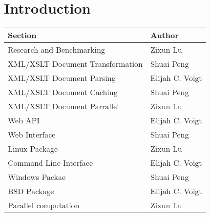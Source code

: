 \section{Introduction}

\begin{center}
    \begin{tabular}{ | l | p{10cm} |}
    \hline
    Section & Author \\ \hline
    Research and Benchmarking & Zixun Lu \\ \hline
    XML/XSLT Document Transformation & Shuai Peng \\ \hline
    XML/XSLT Document Parsing & Elijah C. Voigt \\ \hline
    XML/XSLT Document Caching & Shuai Peng \\ \hline
    XML/XSLT Document Parrallel & Zixun Lu \\ \hline
    Web API & Elijah C. Voigt\\ \hline
    Web Interface & Shuai Peng \\ \hline
    Linux Package & Zixun Lu \\ \hline
    Command Line Interface& Elijah C. Voigt \\ \hline
    Windows Packae & Shuai Peng \\ \hline
    BSD Package & Elijah C. Voigt \\ \hline
    Parallel computation & Zixun Lu \\ \hline
    \end{tabular}
\end{center}

\tableofcontents

\newpage

\clearpage




\newpage
